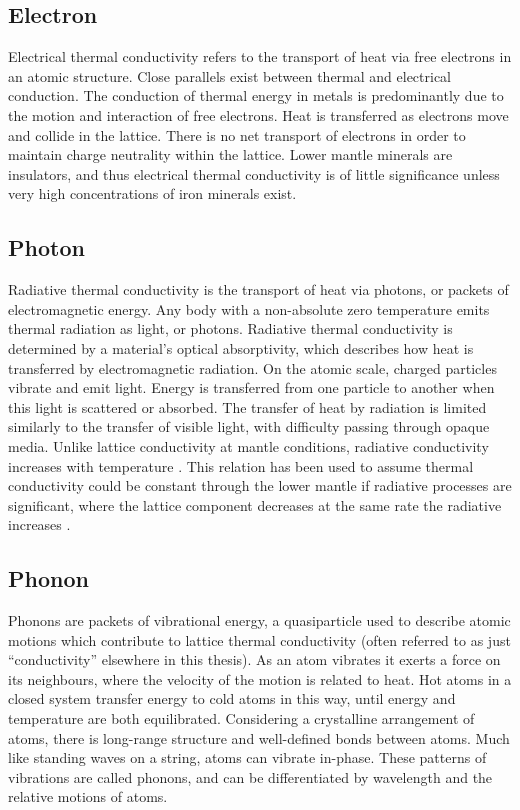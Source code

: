\subsection{Electron}

Electrical thermal conductivity refers to the transport of heat via free electrons in an atomic structure. Close parallels exist between thermal and electrical conduction. The conduction of thermal energy in metals is predominantly due to the motion and interaction of free electrons. Heat is transferred as electrons move and collide in the lattice. There is no net transport of electrons in order to maintain charge neutrality within the lattice. Lower mantle minerals are insulators, and thus electrical thermal conductivity is of little significance unless very high concentrations of iron minerals exist. 

\subsection{Photon}

Radiative thermal conductivity is the transport of heat via photons, or packets of electromagnetic energy. Any body with a non-absolute zero temperature emits thermal radiation as light, or photons. Radiative thermal conductivity is determined by a material's optical absorptivity, which describes how heat is transferred by electromagnetic radiation. On the atomic scale, charged particles vibrate and emit light. Energy is transferred from one particle to another when this light is scattered or absorbed. The transfer of heat by radiation is limited similarly to the transfer of visible light, with difficulty passing through opaque media. Unlike lattice conductivity at mantle conditions, radiative conductivity increases with temperature \citep{Hofmeister1999}. This relation has been used to assume thermal conductivity could be constant through the lower mantle if radiative processes are significant, where the lattice component decreases at the same rate the radiative increases \citep{Tang2014}.

\subsection{Phonon}
\label{sec.phonon_explan}

Phonons are packets of vibrational energy, a quasiparticle used to describe atomic motions which contribute to lattice thermal conductivity (often referred to as just ``conductivity'' elsewhere in this thesis). As an atom vibrates it exerts a force on its neighbours, where the velocity of the motion is related to heat. Hot atoms in a closed system transfer energy to cold atoms in this way, until energy and temperature are both equilibrated. Considering a crystalline arrangement of atoms, there is long-range structure and well-defined bonds between atoms. Much like standing waves on a string, atoms can vibrate in-phase. These patterns of vibrations are called phonons, and can be differentiated by wavelength and the relative motions of atoms.

